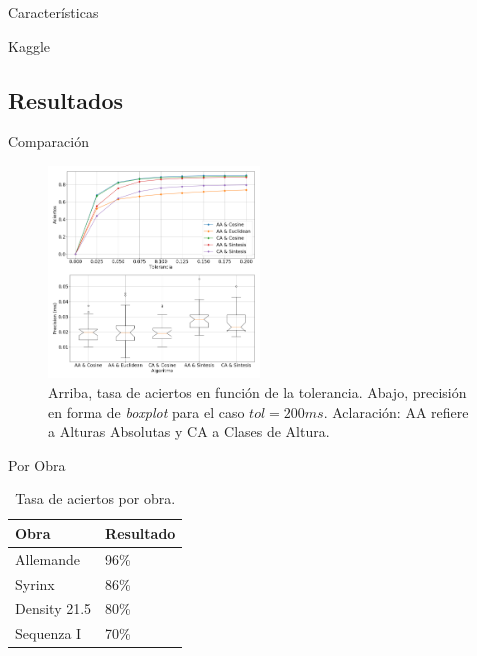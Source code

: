 \documentclass
  [ams,pdfout]%
	{aeslac}
\begin{document}
Características

Kaggle

\subsection{Resultados}
Comparación

\begin{figure}[h!]
\begin{center}
\includegraphics[width=0.5\textwidth]{imagenes/comparacion} 	
\caption{Arriba, tasa de aciertos en función de la tolerancia. Abajo, precisión en forma de \textit{boxplot} para el caso $tol=200ms$. Aclaración: AA refiere a Alturas Absolutas y CA a Clases de Altura.}
\label{fig:datos_tabla}
\end{center}
\end{figure}


Por Obra

\begin{table}[!ht]
\caption{Tasa de aciertos por obra.}
\label{tab:por_obra}
\vspace*{10pt}
\centering
\small
\begin{tabular}{ll}
\textbf{Obra}	&	\textbf{Resultado}\\ \hline
Allemande     & 96\%   \\
Syrinx & 86\%   \\
Density 21.5 & 80\%   \\
Sequenza I & 70\%   \\
\end{tabular}
\end{table}


%
%
%
\end{document}
